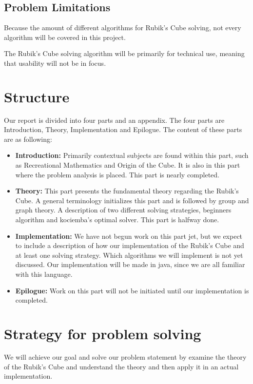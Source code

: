 \documentclass{article}
\begin{document}
\subsection{Problem Limitations}
Because the amount of different algorithms for Rubik's Cube solving, not every algorithm will be covered in this project.

The Rubik's Cube solving algorithm will be primarily for technical use, meaning that usability will not be in focus.

\section{Structure}
Our report is divided into four parts and an appendix. The four parts are Introduction, Theory, Implementation and Epilogue.
The content of these parts are as following:
\begin{itemize}
	\item \textbf{Introduction:} Primarily contextual subjects are found within this part, such as Recreational Mathematics and Origin of the Cube. It is also in this part where the problem analysis is placed. This part is nearly completed.
	\item \textbf{Theory:} This part presents the fundamental theory regarding the Rubik's Cube. A general terminology initializes this part and is followed by group and graph theory. A description of two different solving strategies, beginners algorithm and kociemba's optimal solver. This part is halfway done.
	
	\item \textbf{Implementation:} We have not begun work on this part jet, but we expect to include a description of how our implementation of the Rubik's Cube and at least one solving strategy. Which algorithms we will implement is not yet discussed.
	 Our implementation will be made in java, since we are all familiar with this language.
	\item \textbf{Epilogue:} Work on this part will not be initiated until our implementation is completed.
\end{itemize}



\section{Strategy for problem solving}

We will achieve our goal and solve our problem statement by examine the theory of the Rubik's Cube and understand the theory and then apply it in an actual implementation. 
\end{document}
